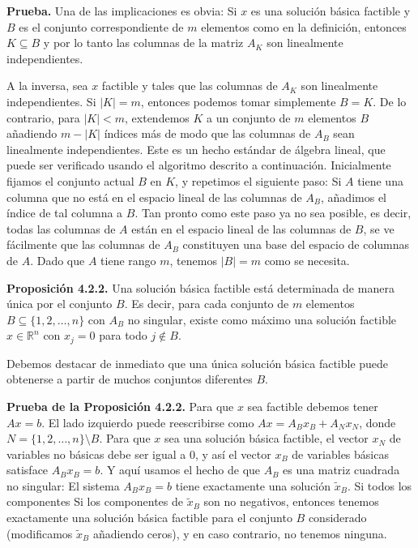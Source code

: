 \documentclass{article}
\begin{document}
\textbf{Prueba.} Una de las implicaciones es obvia: Si \( x \) es una solución básica factible y \( B \) es el conjunto correspondiente de \( m \) elementos como en la definición, entonces \( K \subseteq B \) y por lo tanto las columnas de la matriz \( A_K \) son linealmente independientes.

A la inversa, sea \( x \) factible y tales que las columnas de \( A_K \) son linealmente independientes. Si \( |K| = m \), entonces podemos tomar simplemente \( B = K \). De lo contrario, para \( |K| < m \), extendemos \( K \) a un conjunto de \( m \) elementos \( B \) añadiendo \( m - |K| \) índices más de modo que las columnas de \( A_B \) sean linealmente independientes. Este es un hecho estándar de álgebra lineal, que puede ser verificado usando el algoritmo descrito a continuación. Inicialmente fijamos el conjunto actual \( B \) en \( K \), y repetimos el siguiente paso: Si \( A \) tiene una columna que no está en el espacio lineal de las columnas de \( A_B \), añadimos el índice de tal columna a \( B \). Tan pronto como este paso ya no sea posible, es decir, todas las columnas de \( A \) están en el espacio lineal de las columnas de \( B \), se ve fácilmente que las columnas de \( A_B \) constituyen una base del espacio de columnas de \( A \). Dado que \( A \) tiene rango \( m \), tenemos \( |B| = m \) como se necesita.

\textbf{Proposición 4.2.2.} Una solución básica factible está determinada de manera única por el conjunto \( B \). Es decir, para cada conjunto de \( m \) elementos \( B \subseteq \{1, 2, \ldots, n\} \) con \( A_B \) no singular, existe como máximo una solución factible \( x \in \mathbb{R}^n \) con \( x_j = 0 \) para todo \( j \notin B \).

Debemos destacar de inmediato que una única solución básica factible puede obtenerse a partir de muchos conjuntos diferentes \( B \).

\textbf{Prueba de la Proposición 4.2.2.} Para que \( x \) sea factible debemos tener \( A x = b \). El lado izquierdo puede reescribirse como \( A x = A_B x_B + A_N x_N \), donde \( N = \{1, 2, \ldots, n\} \setminus B \). Para que \( x \) sea una solución básica factible, el vector \( x_N \) de variables no básicas debe ser igual a 0, y así el vector \( x_B \) de variables básicas satisface \( A_B x_B = b \). Y aquí usamos el hecho de que \( A_B \) es una matriz cuadrada no singular: El sistema \( A_B x_B = b \) tiene exactamente una solución \( \tilde{x}_B \). Si todos los componentes Si los componentes de \( \tilde{x}_B \) son no negativos, entonces tenemos exactamente una solución básica factible para el conjunto \( B \) considerado (modificamos \( \tilde{x}_B \) añadiendo ceros), y en caso contrario, no tenemos ninguna.
\end{document}
